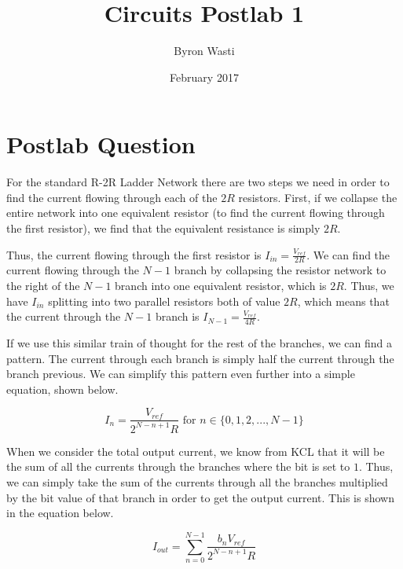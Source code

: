 \documentclass{article}
\title{Circuits Postlab 1}
\author{Byron Wasti}
\date{February 2017}
\begin{document}
\maketitle

\section{Postlab Question}

For the standard R-2R Ladder Network there are two steps we need in order to find the current flowing through each of the $2R$ resistors. First, if we collapse the entire network into one equivalent resistor (to find the current flowing through the first resistor), we find that the equivalent resistance is simply $2R$.

Thus, the current flowing through the first resistor is $I_{in} = \frac{V_{ref}}{2R}$. We can find the current flowing through the $N-1$ branch by collapsing the resistor network to the right of the $N-1$ branch into one equivalent resistor, which is $2R$. Thus, we have $I_{in}$ splitting into two parallel resistors both of value $2R$, which means that the current through the $N-1$ branch is $I_{N-1} = \frac{V_{ref}}{4R}$.

If we use this similar train of thought for the rest of the branches, we can find a pattern. The current through each branch is simply half the current through the branch previous. We can simplify this pattern even further into a simple equation, shown below.

\begin{equation}
    I_{n} = \frac{V_{ref}}{2^{N-n+1}R}  \text{ for } n \in \{0, 1, 2, ..., N-1\}
\end{equation}

When we consider the total output current, we know from KCL that it will be the sum of all the currents through the branches where the bit is set to $1$. Thus, we can simply take the sum of the currents through all the branches multiplied by the bit value of that branch in order to get the output current. This is shown in the equation below.

\begin{equation}
    I_{out} = \sum_{n=0}^{N-1} \frac{b_nV_{ref}}{2^{N-n+1}R}
\end{equation}
\end{document}

